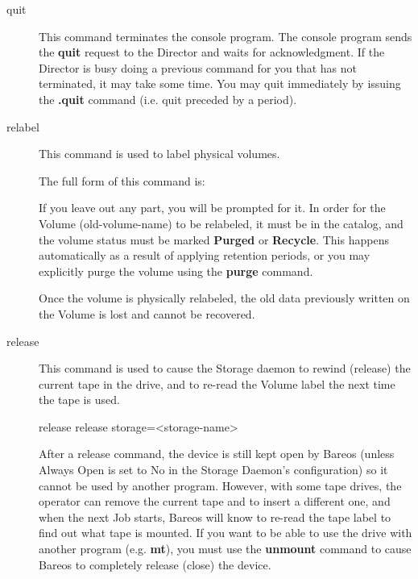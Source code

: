 \begin{description}
\item [quit]
   This command terminates the console program. The  console program sends the
   {\bf quit} request to the Director  and waits for acknowledgment. If the
   Director is busy doing  a previous command for you that has not terminated, it
   may  take some time. You may quit immediately by issuing the  {\bf .quit}
   command (i.e. quit preceded by a period).

\item [relabel]
   This command is used to label physical volumes.

   The full form of this command is:

\begin{bconsole}{relabel}
relabel storage=<storage-name> oldvolume=<old-volume-name> volume=<newvolume-name>}
\end{bconsole}

   If you leave out any part, you will be prompted for it.  In order for
   the Volume (old-volume-name) to be relabeled, it must be in the catalog,
   and the volume status must be marked {\bf Purged} or {\bf Recycle}.
   This happens automatically as a result of applying retention periods, or
   you may explicitly purge the volume using the {\bf purge} command.

   Once the volume is physically relabeled, the old data previously written
   on the Volume is lost and cannot be recovered.

\item [release]
   This command is used to cause the Storage daemon to rewind (release) the
   current tape in the drive, and to re-read the Volume label the next time
   the tape is used.

\begin{bconsole}{release}
release storage=<storage-name>
\end{bconsole}

   After a release command, the device is still kept open by Bareos (unless
   Always Open is set to No in the Storage Daemon's configuration) so it
   cannot be used by another program.  However, with some tape drives, the
   operator can remove the current tape and to insert a different one, and
   when the next Job starts, Bareos will know to re-read the tape label to
   find out what tape is mounted.  If you want to be able to use the drive
   with another program (e.g.  {\bf mt}), you must use the {\bf unmount}
   command to cause Bareos to completely release (close) the device.


\end{description}
